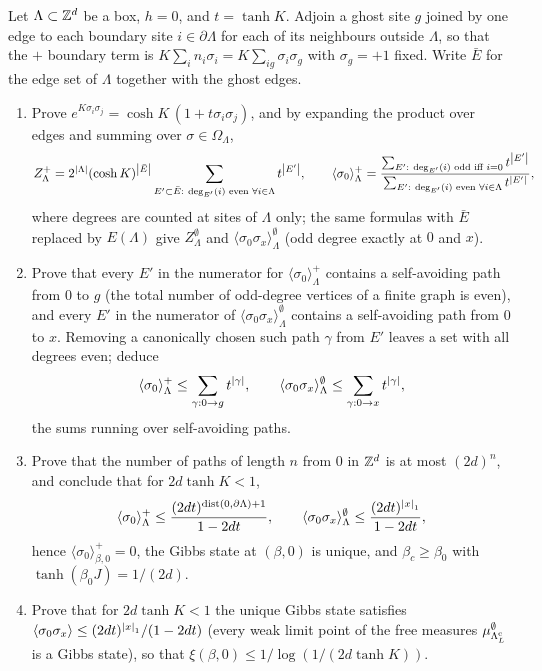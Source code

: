 \begin{exercise}
Let $\Lambda\subset\mathbb Z^d$ be a box, $h=0$, and $t=\tanh K$.  Adjoin a ghost
site $g$ joined by one edge to each boundary site $i\in\partial\Lambda$ for
each of its neighbours outside $\Lambda$, so that the $+$ boundary term is
$K\sum_{i}n_i\sigma_i=K\sum_{ig}\sigma_i\sigma_g$ with $\sigma_g=+1$ fixed.
Write $\bar E$ for the edge set of $\Lambda$ together with the ghost edges.
\begin{enumerate}[label=(\alph*)]
\item Prove $e^{K\sigma_i\sigma_j}=\cosh K\,(1+t\sigma_i\sigma_j)$, and by
expanding the product over edges and summing over $\sigma\in\Omega_\Lambda$,
\[
 Z^+_\Lambda=2^{\left\lvert \Lambda\right\rvert}(\cosh K)^{\left\lvert \bar E\right\rvert}\sum_{E'\subset\bar E:\ \deg_{E'}(i)\text{ even }\forall i\in\Lambda}t^{\left\lvert E'\right\rvert},
 \qquad
 \langle\sigma_0\rangle^+_\Lambda=\frac{\sum_{E':\ \deg_{E'}(i)\text{ odd iff }i=0}t^{\left\lvert E'\right\rvert}}
 {\sum_{E':\ \deg_{E'}(i)\text{ even }\forall i\in\Lambda}t^{\left\lvert E'\right\rvert}},
\]
where degrees are counted at sites of $\Lambda$ only; the same formulas with
$\bar E$ replaced by $E(\Lambda)$ give $Z^\emptyset_\Lambda$ and
$\langle\sigma_0\sigma_x\rangle^\emptyset_\Lambda$ (odd degree exactly at $0$ and $x$).
\item Prove that every $E'$ in the numerator for $\langle\sigma_0\rangle^+_\Lambda$
contains a self-avoiding path from $0$ to $g$ (the total number of odd-degree
vertices of a finite graph is even), and every $E'$ in the numerator of
$\langle\sigma_0\sigma_x\rangle^\emptyset_\Lambda$ contains a self-avoiding path from
$0$ to $x$.  Removing a canonically chosen such path $\gamma$ from $E'$ leaves
a set with all degrees even; deduce
\[
 \langle\sigma_0\rangle^+_\Lambda\le\sum_{\gamma:0\to g}t^{\left\lvert \gamma\right\rvert},\qquad
 \langle\sigma_0\sigma_x\rangle^\emptyset_\Lambda\le\sum_{\gamma:0\to x}t^{\left\lvert \gamma\right\rvert},
\]
the sums running over self-avoiding paths.
\item Prove that the number of paths of length $n$ from $0$ in $\mathbb Z^d$ is at
most $(2d)^n$, and conclude that for $2d\tanh K<1$,
\[
 \langle\sigma_0\rangle^+_\Lambda\le\frac{(2dt)^{\operatorname{dist}(0,\partial\Lambda)+1}}{1-2dt},\qquad
 \langle\sigma_0\sigma_x\rangle^\emptyset_\Lambda\le\frac{(2dt)^{\left\lvert x\right\rvert_1}}{1-2dt},
\]
hence $\langle\sigma_0\rangle^+_{\beta,0}=0$, the Gibbs state at $(\beta,0)$ is
unique, and $\beta_c\ge\beta_0$ with $\tanh(\beta_0J)=1/(2d)$.
\item Prove that for $2d\tanh K<1$ the unique Gibbs state satisfies
$\langle\sigma_0\sigma_x\rangle\le(2dt)^{\left\lvert x\right\rvert_1}/(1-2dt)$ (every weak limit
point of the free measures $\mu^\emptyset_{\Lambda_L^{\rm c}}$ is a Gibbs state), so that
$\xi(\beta,0)\le1/\log(1/(2d\tanh K))$.
\end{enumerate}
\end{exercise}

